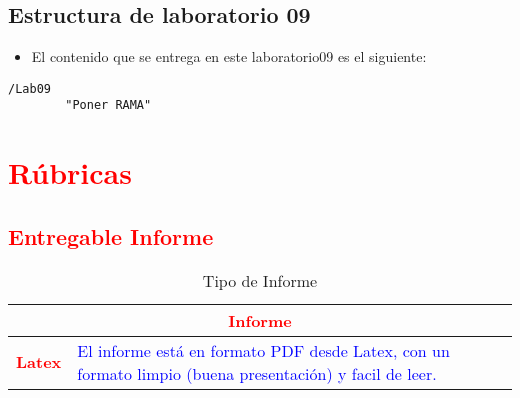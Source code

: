 \documentclass{article}
\begin{document}
	\subsection{Estructura de laboratorio 09}
	\begin{itemize}	
		\item El contenido que se entrega en este laboratorio09 es el siguiente:
	\end{itemize}
	\begin{lstlisting}[style=ascii-tree]
	/Lab09	
		"Poner RAMA"

	\end{lstlisting}    
	\section{\textcolor{red}{Rúbricas}}
	
	\subsection{\textcolor{red}{Entregable Informe}}
	\begin{table}[H]
		\caption{Tipo de Informe}
		\setlength{\tabcolsep}{0.5em} %
		{\renewcommand{\arraystretch}{1.5}%
		\begin{tabular}{|p{3cm}|p{12cm}|}
			\hline
			\multicolumn{2}{|c|}{\textbf{\textcolor{red}{Informe}}}  \\
			\hline 
			\textbf{\textcolor{red}{Latex}} & \textcolor{blue}{El informe está en formato PDF desde Latex,  con un formato limpio (buena presentación) y facil de leer.}   \\ 
			\hline 
			
			
		\end{tabular}
	}
	\end{table}
	
	\clearpage
	
\end{document}

